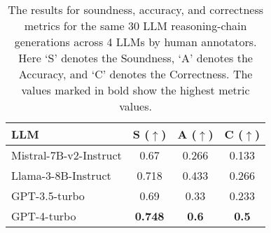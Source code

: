 \begin{table}[!htbp]
\centering
\small
\begin{tabular}{lccc}
\toprule
LLM                       & S ($\uparrow$)& A ($\uparrow$)& C ($\uparrow$)\\
\midrule
Mistral-7B-v2-Instruct & 0.67      & 0.266    & 0.133       \\
Llama-3-8B-Instruct    & 0.718     & 0.433    & 0.266       \\
GPT-3.5-turbo          & 0.69      & 0.33     & 0.233       \\
GPT-4-turbo            & \textbf{0.748}    & \textbf{0.6}      & \textbf{0.5}\\ \bottomrule       
\end{tabular}
\caption{The results for soundness, accuracy, and correctness metrics for the same 30 LLM reasoning-chain generations across 4 LLMs by human annotators. Here `S' denotes the Soundness, `A' denotes the Accuracy, and `C' denotes the Correctness. The values marked in bold show the highest metric values.}
\label{table:metrics_humans}
\end{table}